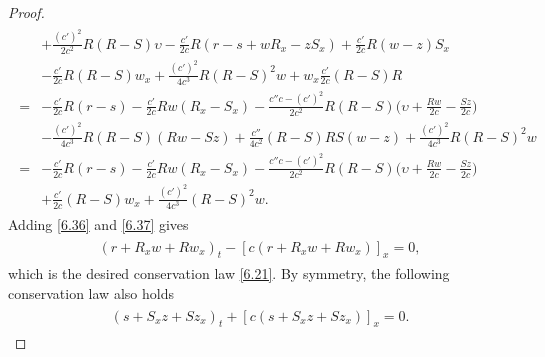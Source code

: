 \documentclass[11pt,reqno]{article}
\newcommand{\fr}{\frac}
\numberwithin{equation}{section}
\begin{document}
\begin{proof}
\begin{align}
\begin{split}
&+\fr{(c')^2}{2c^2}R(R-S)\upsilon -\fr{c'}{2c}R(r-s+wR_x-zS_x) +\fr{c'}{2c}R(w-z)S_x \\
&-\fr{c'}{2c}R(R-S)w_x +\fr{(c')^2}{4c^3}R(R-S)^2w +w_x\fr{c'}{2c}(R-S)R \\
=&-\fr{c'}{2c}R(r-s) -\fr{c'}{2c}Rw(R_x-S_x)-\fr{c''c-(c')^2}{2c^2}R(R-S)\Big(\upsilon+\fr{Rw}{2c}-\fr{Sz}{2c}\Big) \\
&-\fr{(c')^2}{4c^3}R(R-S)(Rw-Sz)+\fr{c''}{4c^2}(R-S)RS(w-z)+\fr{(c')^2}{4c^3}R(R-S)^2w \\
=&-\fr{c'}{2c}R(r-s) -\fr{c'}{2c}Rw(R_x-S_x)-\fr{c''c-(c')^2}{2c^2}R(R-S)\Big(\upsilon+\fr{Rw}{2c}-\fr{Sz}{2c}\Big) \\
&+\fr{c'}{2c}(R-S)w_x +\fr{(c')^2}{4c^3}(R-S)^2w.
\end{split}
\end{align}
Adding \eqref{6.36} and \eqref{6.37} gives
\begin{align}\label{6.38}
\begin{split}
(r+R_x w+Rw_x)_t-[c(r+R_x w+Rw_x)]_x=0,
\end{split}
\end{align}
which is the desired conservation law \eqref{6.21}. By symmetry, the following conservation law also holds
\begin{align}\label{6.39}
\begin{split}
(s+S_x z+Sz_x)_t+[c(s+S_x z+Sz_x)]_x=0.
\end{split}
\end{align}


\end{proof}
\end{document}

